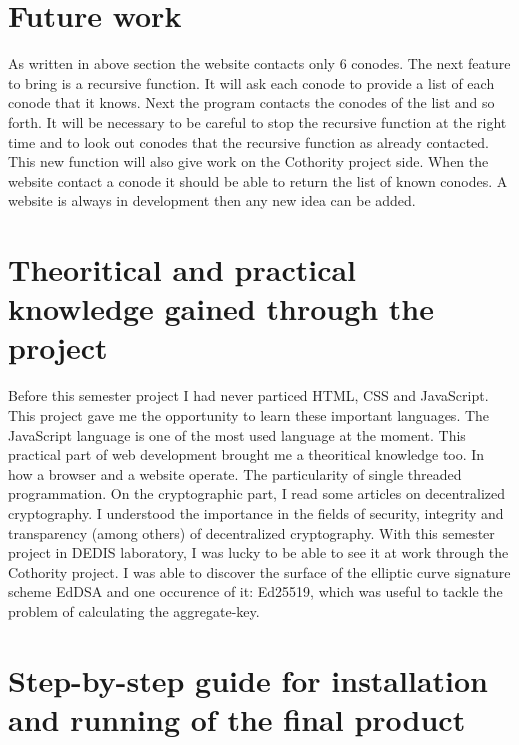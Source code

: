 \documentclass[11pt, a4paper, twoside, openright, openany]{article}
\begin{document}
\section{Future work}
As written in above section the website contacts only 6 conodes. The next feature
to bring is a recursive function. It will ask each conode to provide a list of each conode
that it knows. Next the program contacts the conodes of the list and so forth.
\newline
It will be necessary to be careful to stop the recursive function at the right time and
to look out conodes that the recursive function as already contacted.
\newline
This new function will also give work on the Cothority project side. When the website
contact a conode it should be able to return the list of known conodes.
\newline \newline
A website is always in development then any new idea can be added.
\bigbreak

\section{Theoritical and practical knowledge gained through the project}
Before this semester project I had never particed HTML, CSS and JavaScript. This
project gave me the opportunity to learn these important languages. The JavaScript language is
one of the most used language at the moment.
\newline
This practical part of web development brought me a theoritical knowledge too.
In how a browser and a website operate. The particularity of single threaded programmation.
\newline \newline
On the cryptographic part, I read some articles on decentralized cryptography.
I understood the importance in the fields of security, integrity and transparency (among others) of decentralized cryptography.
With this semester project in DEDIS laboratory, I was lucky to be able to see it at work through the Cothority project.
\newline
I was able to discover the surface of the elliptic curve signature scheme EdDSA and
one occurence of it: Ed25519, which was useful to tackle the problem of calculating the aggregate-key.
\bigbreak

\section{Step-by-step guide for installation and running of the final product}
\end{document}

